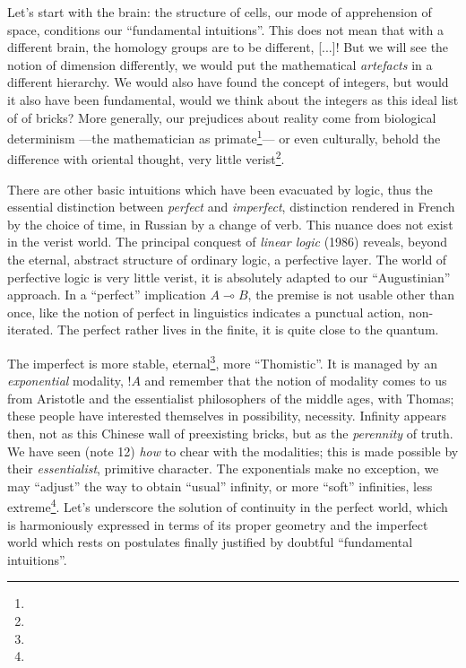 \documentclass{article}
\begin{document}
Let's start with the brain: the structure of cells, our mode of apprehension of space, conditions our \enquote{fundamental intuitions}. This does not mean that with a different brain, the homology groups are to be different, [...]! But we will see the notion of dimension differently, we would put the mathematical \emph{artefacts} in a different hierarchy. We would also have found the concept of integers, but would it also have been fundamental, would we think about the integers as this ideal list of of bricks? More generally, our prejudices about reality come from biological determinism ---the mathematician as primate\footnote{}--- or even culturally, behold the difference with oriental thought, very little verist\footnote{}.

There are other basic intuitions which have been evacuated by logic, thus the essential distinction between \emph{perfect} and \emph{imperfect}, distinction rendered in French by the choice of time, in Russian by a change of verb. This nuance does not exist in the verist world. The principal conquest of \emph{linear logic} (1986) reveals, beyond the eternal, abstract structure of ordinary logic, a perfective layer. The world of perfective logic is very little verist, it is absolutely adapted to our \enquote{Augustinian} approach. In a \enquote{perfect} implication $A \multimap B$, the premise is not usable other than once, like the notion of perfect in linguistics indicates a punctual action, non-iterated. The perfect rather lives in the finite, it is quite close to the quantum.

The imperfect is more stable, eternal\footnote{}, more \enquote{Thomistic}. It is managed by an \emph{exponential} modality, $!A$ and remember that the notion of modality comes to us from Aristotle and the essentialist philosophers of the middle ages, with Thomas; these people have interested themselves in possibility, necessity. Infinity appears then, not as this Chinese wall of preexisting bricks, but as the \emph{perennity} of truth. We have seen (note 12) \emph{how} to chear with the modalities; this is made possible by their \emph{essentialist}, primitive character. The exponentials make no exception, we may \enquote{adjust} the way to obtain \enquote{usual} infinity, or more \enquote{soft} infinities, less extreme\footnote{}. Let's underscore the solution of continuity in the perfect world, which is harmoniously expressed in terms of its proper geometry and the imperfect world which rests on postulates finally justified by doubtful \enquote{fundamental intuitions}.
\end{document}

